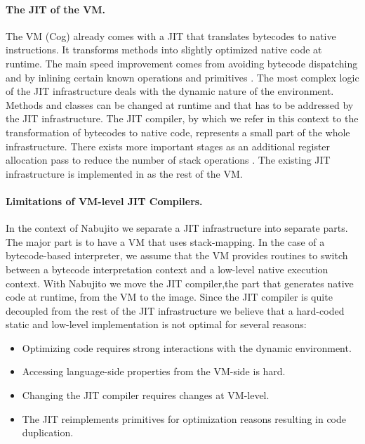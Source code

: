 \paragraph{The JIT of the \PH VM.}
The \PH VM (Cog) already comes with a JIT that translates bytecodes to native instructions.
It transforms \ST methods into slightly optimized native code at runtime.
The main speed improvement comes from avoiding bytecode dispatching and by inlining certain known operations and primitives \cite{Ayco03a}.
The most complex logic of the JIT infrastructure deals with the dynamic nature of the \ST environment.
Methods and classes can be changed at runtime and that has to be addressed by the JIT infrastructure.
The JIT compiler, by which we refer in this context to the transformation of bytecodes to native code, represents a small part of the whole infrastructure.
There exists more important stages as an additional register allocation pass to reduce the number of stack operations \cite{Mira99a,Mira11a}.
The existing JIT infrastructure is implemented in \Slang \cite[Ch.\ 5]{Blac09a} as the rest of the VM.

\paragraph{Limitations of VM-level JIT Compilers.}
In the context of Nabujito we separate a JIT infrastructure into separate parts.
The major part is to have a VM that uses stack-mapping.
In the case of a bytecode-based interpreter, we assume that the VM provides routines to switch between a bytecode interpretation context and a low-level native execution context.
With Nabujito we move the JIT compiler,the part that generates native code at runtime, from the VM to the image.%
 Since the JIT compiler is quite decoupled from the rest of the JIT infrastructure we believe that a hard-coded static and low-level implementation is not optimal for several reasons:

\begin{itemize}
	\item Optimizing \ST code requires strong interactions with the dynamic environment.
	\item Accessing language-side properties from the VM-side is hard.
	\item Changing the JIT compiler requires changes at VM-level.
	\item The JIT reimplements primitives for optimization reasons resulting in code duplication.
\end{itemize}

